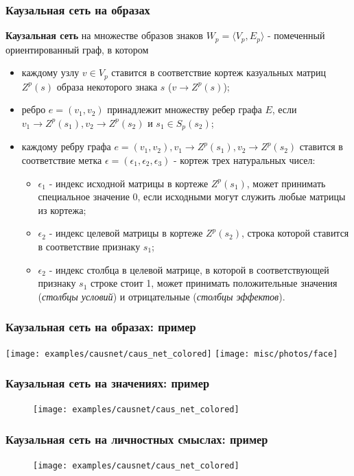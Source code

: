 \documentclass[default]{beamer}
\begin{document}
	\begin{frame}
\frametitle{Каузальная сеть на образах}
\footnotesize
\textbf{Каузальная сеть} на множестве образов знаков $W_p=\langle V_p, E_p \rangle$ - помеченный ориентированный граф, в котором
\begin{itemize}
	\item каждому узлу $v\in V_p$ ставится в соответствие кортеж казуальных матриц $Z^p(s)$ образа некоторого знака $s$ ($v\rightarrow Z^p(s)$);
	\item ребро $e=(v_1, v_2)$ принадлежит множеству ребер графа $E$, если $v_1\rightarrow Z^p(s_1), v_2\rightarrow Z^p(s_2)$ и $s_1\in S_p(s_2)$;
	\item каждому ребру графа $e=(v_1, v_2), v_1\rightarrow Z^p(s_1), v_2\rightarrow Z^p(s_2)$ ставится в соответствие метка $\epsilon=(\epsilon_1,\epsilon_2,\epsilon_3)$ - кортеж трех натуральных чисел:
	\begin{itemize}
		\item $\epsilon_1$ - индекс исходной матрицы в кортеже $Z^p(s_1)$, может принимать специальное значение 0, если исходными могут служить любые матрицы из кортежа;
		\item $\epsilon_2$ - индекс целевой матрицы в кортеже $Z^p(s_2)$, строка которой ставится в соответствие признаку $s_1$;
		\item $\epsilon_2$ - индекс столбца в целевой матрице, в которой в соответствующей признаку $s_1$ строке стоит 1, может принимать положительные значения (\textit{столбцы условий}) и отрицательные (\textit{столбцы эффектов}).
	\end{itemize}		
\end{itemize}
\end{frame}

	\begin{frame}
		\frametitle{Каузальная сеть на образах: пример}
	
		\centering
		\texttt{[image: examples/causnet/caus\_net\_colored]}
		\texttt{[image: misc/photos/face]}
	\end{frame}
	
	\begin{frame}
		\frametitle{Каузальная сеть на значениях: пример}
		
		\begin{figure}
		\texttt{[image: examples/causnet/caus\_net\_colored]}
		\end{figure}
	
	\end{frame}
	
	\begin{frame}
		\frametitle{Каузальная сеть на личностных смыслах: пример}
		
		\begin{figure}
		\texttt{[image: examples/causnet/caus\_net\_colored]}
		\end{figure}
	
	\end{frame}		
\end{document}
